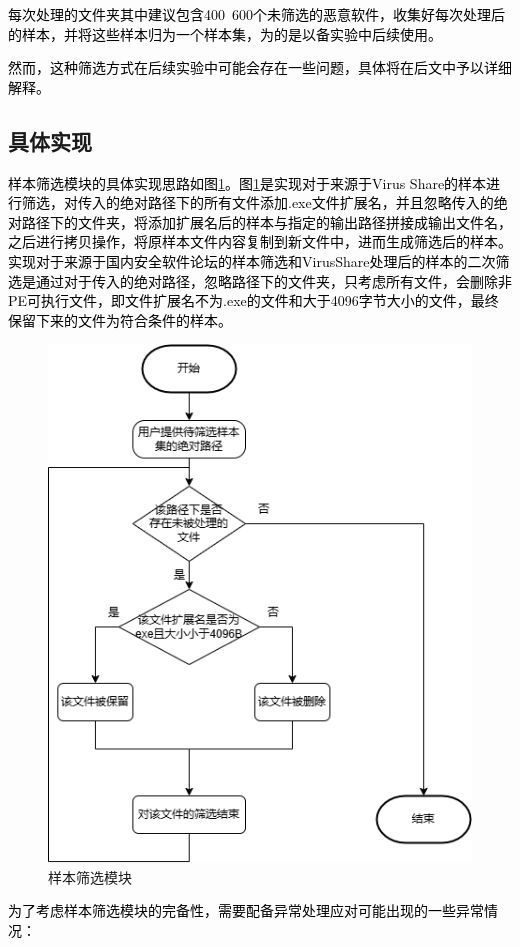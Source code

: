 \textcolor{black}{每次处理的文件夹其中建议包含400~600个未筛选的恶意软件，收集好每次处理后的样本，并将这些样本归为一个样本集，为的是以备实验中后续使用。}

\textcolor{black}{然而，这种筛选方式在后续实验中可能会存在一些问题，具体将在后文中予以详细解释。}

\subsection{具体实现}

\textcolor{black}{样本筛选模块的具体实现思路如图\ref{fig:sample_swift_module}。图\ref{fig:sample_swift_module}是实现对于来源于Virus Share的样本进行筛选，对传入的绝对路径下的所有文件添加.exe文件扩展名，并且忽略传入的绝对路径下的文件夹，将添加扩展名后的样本与指定的输出路径拼接成输出文件名，之后进行拷贝操作，将原样本文件内容复制到新文件中，进而生成筛选后的样本。实现对于来源于国内安全软件论坛的样本筛选和VirusShare处理后的样本的二次筛选是通过对于传入的绝对路径，忽略路径下的文件夹，只考虑所有文件，会删除非PE可执行文件，即文件扩展名不为.exe的文件和大于4096字节大小的文件，最终保留下来的文件为符合条件的样本。}

\begin{figure}
  \centering
  \includegraphics[]{images/sample_swift_module.png}
  \caption{样本筛选模块}\label{fig:sample_swift_module}
\end{figure}
\textcolor{black}{为了考虑样本筛选模块的完备性，需要配备异常处理应对可能出现的一些异常情况：}


